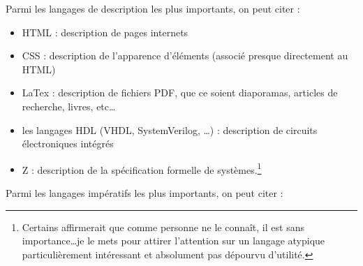 \documentclass[../../main.tex]{subfiles}
\begin{document}
Parmi les langages de description les plus importants, on peut citer :
\begin{itemize}
	\item HTML : description de pages internets
	\item CSS : description de l'apparence d'éléments (associé presque directement au HTML)
	\item LaTex : description de fichiers PDF, que ce soient diaporamas, articles de recherche, livres, etc\dots
	\item les langages HDL (VHDL, SystemVerilog, \dots) : description de circuits électroniques intégrés
	\item Z : description de la spécification formelle de systèmes.\footnote{Certains affirmerait que comme personne ne le connaît, il est sans importance\dots je le mets pour attirer l'attention sur un langage atypique particulièrement intéressant et absolument pas dépourvu d'utilité.}
\end{itemize}
Parmi les langages impératifs les plus importants, on peut citer :
\end{document}

